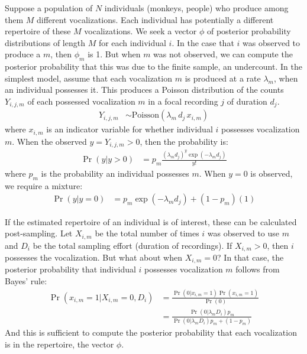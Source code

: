\documentclass[reqno ,11pt]{amsart}
\begin{document}
Suppose a population of $N$ individuals (monkeys, people) who produce among them $M$ different vocalizations. Each individual has potentially a different repertoire of these $M$ vocalizations. We seek a vector $\phi$ of posterior probability distributions of length $M$ for each individual $i$. In the case that $i$ was observed to produce a $m$, then $\phi_m$ is 1. But when $m$ was not observed, we can compute the posterior probability that this was due to the finite sample, an undercount. 
In the simplest model, assume that each vocalization $m$ is produced at a rate $\lambda_m$, when an individual possesses it. This produces a Poisson distribution of the counts $Y_{i,j,m}$ of each possessed vocalization $m$ in a focal recording $j$ of duration $d_j$.
\begin{align*}
Y_{i,j,m} &\sim \mathrm{Poisson}(  \lambda_m \, d_j \, x_{i,m} )
\end{align*}
where $x_{i,m}$ is an indicator variable for whether individual $i$ possesses vocalization $m$. 
When the observed $y=Y_{i,j,m}>0$, then the probability is:
\begin{align*}
\Pr(y|y>0) &= p_{m} \frac{( \lambda_m d_j )^y \exp(-\lambda_m d_j) }{ y! }
\end{align*}
where $p_m$ is the probability an individual possesses $m$. When $y=0$ is observed, we require a mixture:
\begin{align*}
\Pr(y|y=0) &= p_{m} \exp(-\lambda_m d_j) + (1-p_{m})(1)
\end{align*}

If the estimated repertoire of an individual is of interest, these can be calculated post-sampling. Let $X_{i,m}$ be the total number of times $i$ was observed to use $m$ and $D_{i}$ be the total sampling effort (duration of recordings). If $X_{i,m}>0$, then $i$ possesses the vocalization. But what about when $X_{i,m}=0$? In that case, the posterior probability that individual $i$ possesses vocalization $m$ follows from Bayes' rule:
\begin{align*}
	\Pr(x_{i,m}=1|X_{i,m}=0,D_{i}) &= \frac{\Pr(0|x_{i,m}=1)\Pr(x_{i,m}=1)}{\Pr(0)} \\ 
	&= \frac{\Pr(0|\lambda_m D_{i})p_m}{\Pr(0|\lambda_m D_{i})p_m + (1-p_m)}
\end{align*}
And this is sufficient to compute the posterior probability that each vocalization is in the repertoire, the vector $\phi$.
\end{document}
